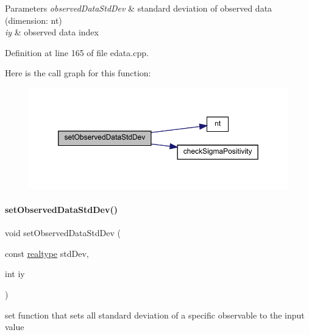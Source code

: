\begin{DoxyParams}{Parameters}
{\em observed\+Data\+Std\+Dev} & standard deviation of observed data (dimension\+: nt) \\
\hline
{\em iy} & observed data index \\
\hline
\end{DoxyParams}


Definition at line 165 of file edata.\+cpp.

Here is the call graph for this function\+:
\nopagebreak
\begin{figure}[H]
\begin{center}
\leavevmode
\includegraphics[width=350pt]{classamici_1_1_exp_data_a90948c75e8ce51cd69be08a92215e6c2_cgraph}
\end{center}
\end{figure}
\mbox{\label{classamici_1_1_exp_data_a10c64e99f5f3a2b19e3944b69b0d69ff}} 
\paragraph{\texorpdfstring{set\+Observed\+Data\+Std\+Dev()}{setObservedDataStdDev()}\hspace{0.1cm}{\footnotesize\ttfamily [4/4]}}
{\footnotesize\ttfamily void set\+Observed\+Data\+Std\+Dev (\begin{DoxyParamCaption}\item[{const \mbox{\hyperlink{namespaceamici_a1bdce28051d6a53868f7ccbf5f2c14a3}{realtype}}}]{std\+Dev,  }\item[{int}]{iy }\end{DoxyParamCaption})}

set function that sets all standard deviation of a specific observable to the input value


